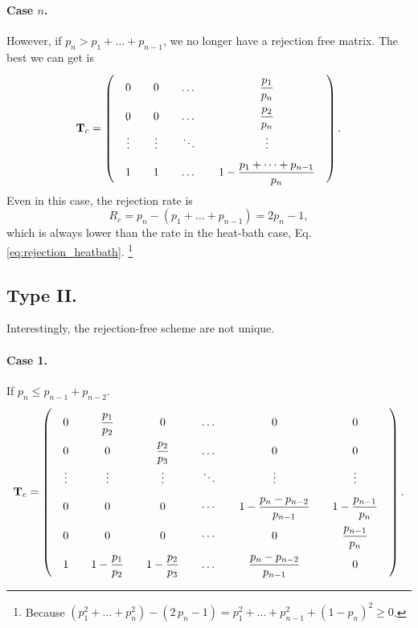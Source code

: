 \documentclass[12pt]{article}
\begin{document}
\paragraph{Case $n$.}

However, if $p_n > p_1 + \dots + p_{n-1}$, we no longer
have a rejection free matrix.  The best we can get is
\begin{equation}
  \mathbf T_{c}
=
\left(
  \arraycolsep=10.0pt\def\arraystretch{2.0}
  \begin{array}{cccccc}
    0     &   0   &   \dots  &   \dfrac{p_1}{p_n}       \\
    0     &   0   &   \dots  &   \dfrac{p_2}{p_n} \\
    \vdots&\vdots &   \ddots &   \vdots \\
    1 &  1 &   \dots  &   1 - \dfrac{p_1 + \cdots + p_{n-1}}{p_n} \\
  \end{array}
\right).
\label{eq:T_convective_n}
\end{equation}
Even in this case,
the rejection rate is
\begin{equation}
R_c = p_n - (p_1 + \dots + p_{n-1}) = 2 p_n - 1,
\label{eq:rejection_convective}
\end{equation}
which is always lower than the rate
in the heat-bath case,
Eq. \eqref{eq:rejection_heatbath}.
\footnote{
  Because
  $(p_1^2 + \dots + p_n^2) -  (2 \, p_n - 1)
  = p_1^2 + \dots + p_{n-1}^2 + (1 - p_n)^2 \ge 0$.
}

\subsection{Type II.}

Interestingly, the rejection-free scheme are not unique.

\paragraph{Case 1.}

If $p_n \le p_{n-1} + p_{n-2}$.
$$
  \mathbf T_{c}
=
\left(
  \arraycolsep=10.0pt\def\arraystretch{2.0}
  \begin{array}{ccccccc}
    0  & \dfrac{p_1}{p_2}   &   0   &   \dots  & 0  & 0 \\
    0  &   0   & \dfrac{p_2}{p_3}  &   \dots  &  0 & 0 \\
    \vdots&\vdots &\vdots &   \ddots &   \vdots & \vdots\\
    0 & 0 &0 &   \cdots &   1 - \dfrac{ p_n - p_{n-2} } {p_{n-1}} & 1 - \dfrac{p_{n-1}}{p_n}\\
    0 & 0 &0 &   \cdots &  0 & \dfrac{p_{n-1}}{p_n}\\
    1 &  1 - \dfrac{p_1}{p_2} &   1 - \dfrac{p_2}{p_3}   &   \dots  &  \dfrac{p_n - p_{n-2}}{p_{n-1}} & 0
  \end{array}
\right).
$$
\end{document}
